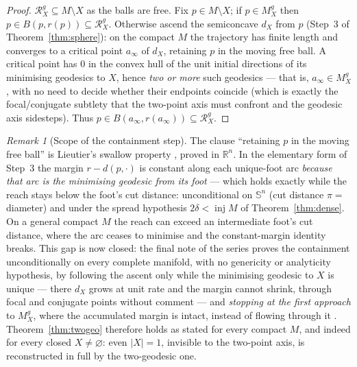 \documentclass[11pt]{article}
\theoremstyle{remark}
\newtheorem{remark}[theorem]{Remark}
\newcommand{\R}{\mathbb{R}}
\newcommand{\X}{X}
\newcommand{\Mx}{M_{\X}}
\newcommand{\Rx}{\mathcal{R}_{\X}}
\newcommand{\inj}{\operatorname{inj}}
\newcommand{\Sn}{\mathbb{S}^{n}}
\begin{document}
\begin{proof}
$\Rx^{g}\subseteq M\setminus\X$ as the balls are free. Fix $p\in
M\setminus\X$; if $p\in\Mx^{g}$ then $p\in B(p,r(p))\subseteq\Rx^{g}$.
Otherwise ascend the semiconcave $d_{\X}$ from $p$ (Step~3 of
Theorem~\ref{thm:sphere}): on the compact $M$ the trajectory has finite
length and converges to a critical point $a_{\infty}$ of $d_{\X}$, retaining
$p$ in the moving free ball. A critical point has $0$ in the convex hull of
the unit initial directions of its minimising geodesics to $\X$, hence
\emph{two or more} such geodesics --- that is, $a_{\infty}\in\Mx^{g}$, with
no need to decide whether their endpoints coincide (which is exactly the
focal/conjugate subtlety that the two-point axis must confront and the
geodesic axis sidesteps). Thus $p\in B(a_{\infty},r(a_{\infty}))\subseteq
\Rx^{g}$.
\end{proof}

\begin{remark}[Scope of the containment step]\label{rem:containment}
The clause ``retaining $p$ in the moving free ball'' is Lieutier's swallow
property \cite{Lie}, proved in $\R^{n}$. In the elementary form of
Step~3 the margin $r-d(p,\cdot)$ is constant along each unique-foot arc
\emph{because that arc is the minimising geodesic from its foot} --- which
holds exactly while the reach stays below the foot's cut distance:
unconditional on $\Sn$ (cut distance $\pi=$ diameter) and under the spread
hypothesis $2\delta<\inj M$ of Theorem~\ref{thm:dense}. On a general
compact $M$ the reach can exceed an intermediate foot's cut distance, where
the arc ceases to minimise and the constant-margin identity breaks. This
gap is now closed: the final note of the series proves the containment
unconditionally on every complete manifold, with no genericity or
analyticity hypothesis, by following the ascent only while the minimising
geodesic to $\X$ is unique --- there $d_{\X}$ grows at unit rate and the
margin cannot shrink, through focal and conjugate points without
comment --- and \emph{stopping at the first approach} to $\Mx^{g}$, where
the accumulated margin is intact, instead of flowing through it
\cite[Thm.~3.1, Cor.~3.2]{C}. Theorem~\ref{thm:twogeo} therefore holds as
stated for every compact $M$, and indeed for every closed
$\X\neq\varnothing$: even $|\X|=1$, invisible to the two-point axis, is
reconstructed in full by the two-geodesic one.
\end{remark}
\end{document}
